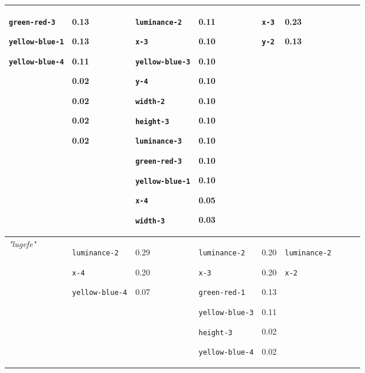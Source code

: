 {\begin{tabular}{@{}p{1.2cm}|p{2.75cm}@{}p{0.8cm}@{}|p{2.75cm}@{}p{0.8cm}@{}|p{2.75cm}@{}p{0.8cm}@{}|p{2.75cm}@{}p{0.8cm}@{}}
\texttt{green-red-3}

\texttt{yellow-blue-1}

\texttt{yellow-blue-4} & 0.13

0.13

0.11

0.02

0.02

0.02

0.02 & \texttt{luminance-2}

\texttt{x-3}

\texttt{yellow-blue-3}

\texttt{y-4}

\texttt{width-2}

\texttt{height-3}

\texttt{luminance-3}

\texttt{green-red-3}

\texttt{yellow-blue-1}

\texttt{x-4}

\texttt{width-3} & 0.11

0.10

0.10

0.10

0.10

0.10

0.10

0.10

0.10

0.05

0.03 & \texttt{x-3}

\texttt{y-2} & 0.23

0.13\\
\hline
\textit{"lugefe"} & \texttt{luminance-2}

\texttt{x-4}

\texttt{yellow-blue-4} & 0.29

0.20

0.07 & \texttt{luminance-2}

\texttt{x-3}

\texttt{green-red-1}

\texttt{yellow-blue-3}

\texttt{height-3}

\texttt{yellow-blue-4} & 0.20

0.20

0.13

0.11

0.02

0.02 & \texttt{luminance-2}

\texttt{x-2}


\end{tabular}}
